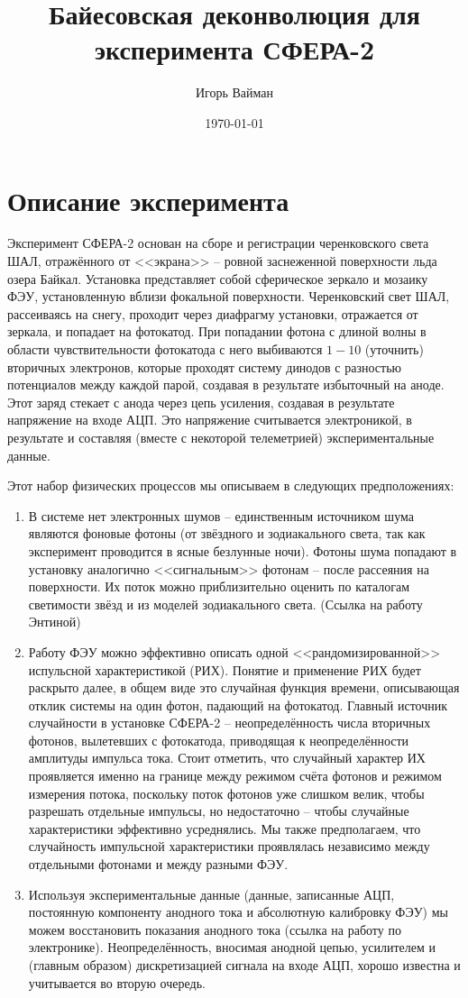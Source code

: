 \documentclass[12pt]{article}
\title{Байесовская деконволюция для эксперимента СФЕРА-2}
\author{Игорь Вайман}
\date{\today}
\begin{document}
	\maketitle
	
	\section{Описание эксперимента}

	Эксперимент СФЕРА-2 основан на сборе и регистрации черенковского света ШАЛ, отражённого от <<экрана>> -- ровной заснеженной поверхности льда озера Байкал. Установка представляет собой сферическое зеркало и мозаику ФЭУ, установленную вблизи фокальной поверхности. Черенковский свет ШАЛ, рассеиваясь на снегу, проходит через диафрагму установки, отражается от зеркала, и попадает на фотокатод. При попадании фотона с длиной волны в области чувствительности фотокатода с него выбиваются $1 - 10$ (уточнить) вторичных электронов, которые проходят систему динодов с разностью потенциалов между каждой парой, создавая в результате избыточный на аноде. Этот заряд стекает с анода через цепь усиления, создавая в результате напряжение на входе АЦП. Это напряжение считывается электроникой, в результате и составляя (вместе с некоторой телеметрией) экспериментальные данные.
	
	Этот набор физических процессов мы описываем в следующих предположениях:
	
	\begin{enumerate}
		\item В системе нет электронных шумов -- единственным источником шума являются фоновые фотоны (от звёздного и зодиакального света, так как эксперимент проводится в ясные безлунные ночи). Фотоны шума попадают в установку аналогично <<сигнальным>> фотонам -- после рассеяния на поверхности. Их поток можно приблизительно оценить по каталогам светимости звёзд и из моделей зодиакального света. (Ссылка на работу Энтиной)
		\item Работу ФЭУ можно эффективно описать одной <<рандомизированной>> испульсной характеристикой (РИХ). Понятие и применение РИХ будет раскрыто далее, в общем виде это случайная функция времени, описывающая отклик системы на один фотон, падающий на фотокатод. Главный источник случайности в установке СФЕРА-2 -- неопределённость числа вторичных фотонов, вылетевших с фотокатода, приводящая к неопределённости амплитуды импульса тока. Стоит отметить, что случайный характер ИХ проявляется именно на границе между режимом счёта фотонов и режимом измерения потока, поскольку поток фотонов уже слишком велик, чтобы разрешать отдельные импульсы, но недостаточно -- чтобы случайные характеристики эффективно усреднялись. Мы также предполагаем, что случайность импульсной характеристики проявлялась независимо между отдельными фотонами и между разными ФЭУ.
		\item Используя экспериментальные данные (данные, записанные АЦП, постоянную компоненту анодного тока и абсолютную калибровку ФЭУ) мы можем восстановить показания анодного тока (ссылка на работу по электронике). Неопределённость, вносимая анодной цепью, усилителем и (главным образом) дискретизацией сигнала на входе АЦП, хорошо известна и учитывается во вторую очередь.
	\end{enumerate}
\end{document}
